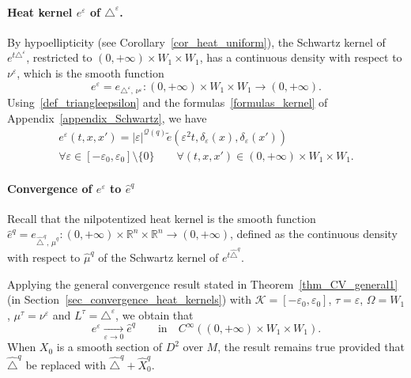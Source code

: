 \documentclass[AHL,Unicode,published]{cedram}
\newcommand*\R{\mathbb{R}}
\newcommand{\calQ}{\mathcal{Q}}
\newcommand{\calK}{\mathcal{K}}
\let\oldforall\forall
\renewcommand*{\forall}{\mathrel{\oldforall}}
\begin{document}
\goodbreak
\paragraph{Heat kernel $e^\varepsilon$ of $\triangle^\varepsilon$.}
By hypoellipticity (see Corollary~\ref{cor_heat_uniform}), the Schwartz kernel of $e^{t\triangle^\varepsilon}$, restricted to $(0,+\infty)\times W_1\times W_1$, has a continuous density with respect to $\nu^\varepsilon$, which is the smooth function
\[
e^\varepsilon = e_{\triangle^\varepsilon,\,\nu^\varepsilon}: (0,+\infty)\times W_1\times W_1\rightarrow(0,+\infty).
\]
Using~\eqref{def_triangleepsilon} and the formulas~\eqref{formulas_kernel} of Appendix~\ref{appendix_Schwartz}, we have
\begin{multline}\label{relation_eY_eepsilon}
e^\varepsilon(t,x,x') = \vert \varepsilon\vert^{\calQ(q)} \widetilde e\left(\varepsilon^2t,\delta_\varepsilon(x),\delta_\varepsilon(x')\right) \\
\forall \varepsilon\in[-\varepsilon_0,\varepsilon_0]\setminus\{0\} \qquad \forall (t,x,x')\in(0,+\infty)\times W_1\times W_1.
\end{multline}


\goodbreak
\paragraph{Convergence of $e^\varepsilon$ to $\widehat{e}^{q}$}
Recall that the nilpotentized heat kernel is the smooth function $\widehat{e}^{q} = e_{\widehat{\triangle}^{q},\,\widehat{\mu}^{q}}: (0,+\infty)\times\R^n\times\R^n\rightarrow(0,+\infty)$, defined as the continuous density with respect to $\widehat{\mu}^{q}$ of the Schwartz kernel of $e^{t\widehat{\triangle}^{q}}$.

Applying the general convergence result stated in Theorem~\ref{thm_CV_general1} (in Section~\ref{sec_convergence_heat_kernels}) with $\calK = [-\varepsilon_0,\varepsilon_0]$, $\tau=\varepsilon$, $\Omega=W_1$, $\mu^\tau=\nu^\varepsilon$ and $L^\tau = \triangle^\varepsilon$, we obtain that
\begin{equation}\label{CVeepsehat}
e^\varepsilon \underset{\varepsilon\rightarrow 0}{\longrightarrow} \widehat{e}^{q} \qquad\text{in}\quad C^\infty\left((0,+\infty)\times W_1\times W_1\right).
\end{equation}
When $X_0$ is a smooth section of $D^2$ over $M$, the result remains true provided that $\widehat{\triangle}^{q}$ be replaced with $\widehat{\triangle}^{q} +\widehat{X}_0^{q}$.
\end{document}
